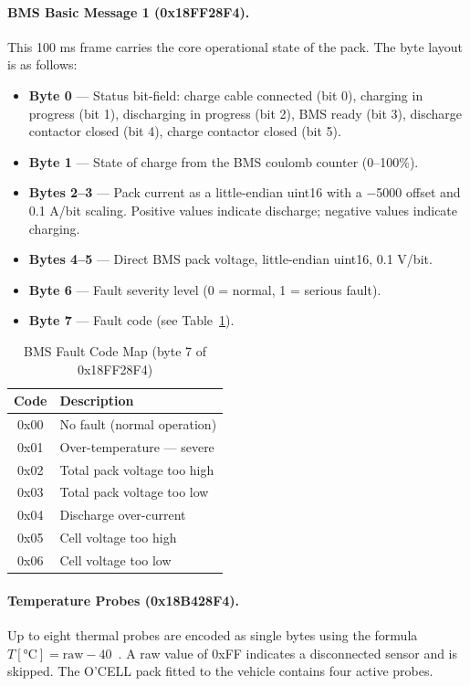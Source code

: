 \paragraph{BMS Basic Message 1 (0x18FF28F4).}
This 100 ms frame carries the core operational state of the pack. The byte layout is as follows:

\begin{itemize}
    \item \textbf{Byte 0} — Status bit-field: charge cable connected (bit 0), charging in progress (bit 1), discharging in progress (bit 2), BMS ready (bit 3), discharge contactor closed (bit 4), charge contactor closed (bit 5).
    \item \textbf{Byte 1} — State of charge from the BMS coulomb counter (0--100\%).
    \item \textbf{Bytes 2--3} — Pack current as a little-endian uint16 with a $-$5000 offset and 0.1 A/bit scaling. Positive values indicate discharge; negative values indicate charging.
    \item \textbf{Bytes 4--5} — Direct BMS pack voltage, little-endian uint16, 0.1 V/bit.
    \item \textbf{Byte 6} — Fault severity level (0 = normal, 1 = serious fault).
    \item \textbf{Byte 7} — Fault code (see Table~\ref{tab:fault-codes}).
\end{itemize}

\begin{table}[h]
    \centering
    \caption{BMS Fault Code Map (byte 7 of 0x18FF28F4)}
    \label{tab:fault-codes}
    \begin{tabular}{cl}
        \toprule
        \textbf{Code} & \textbf{Description} \\
        \midrule
        0x00 & No fault (normal operation) \\
        0x01 & Over-temperature — severe \\
        0x02 & Total pack voltage too high \\
        0x03 & Total pack voltage too low \\
        0x04 & Discharge over-current \\
        0x05 & Cell voltage too high \\
        0x06 & Cell voltage too low \\
        \bottomrule
    \end{tabular}
\end{table}

\paragraph{Temperature Probes (0x18B428F4).}
Up to eight thermal probes are encoded as single bytes using the formula $T[\text{°C}] = \text{raw} - 40$~\cite{ds18b20datasheet}. A raw value of 0xFF indicates a disconnected sensor and is skipped. The O'CELL pack fitted to the vehicle contains four active probes.

